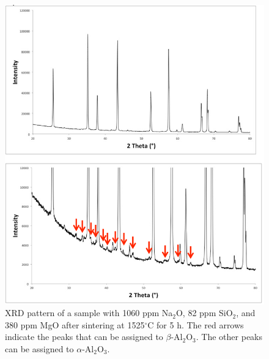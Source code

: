 \newpage
\begin{figure}[H]
	\centering
	\includegraphics[width=\textwidth]{Chapter-5/Figures/Figure9.png}
	\caption{XRD pattern of a sample with 1060 ppm Na$_{2}$O, 82 ppm SiO$_{2}$, and 380 ppm MgO after sintering at 1525$^{\circ}$C for 5 h. The red arrows indicate the peaks that can be assigned to $\beta$-Al$_{2}$O$_{3}$. The other peaks can be assigned to $\alpha$-Al$_{2}$O$_{3}$.}
	\label{Ch5-figure:Figure9}
\end{figure}

